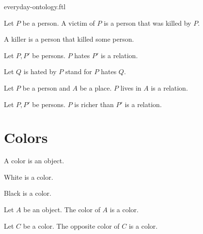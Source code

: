 \documentclass{stex}
\begin{document}
\begin{smodule}{everyday-ontology.ftl}
  \begin{fdefinition*}
    Let $P$ be a person.
    A victim of $P$ is a person that was killed by $P$.
  \end{fdefinition*}

  \begin{fdefinition*}
    A killer is a person that killed some person.
  \end{fdefinition*}

  \begin{fsignature*}
    Let $P, P'$ be persons.
    $P$ hates $P'$ is a relation.
  \end{fsignature*}

  \begin{fconvention*}
    Let $Q$ is hated by $P$ stand for $P$ hates $Q$.
  \end{fconvention*}

  \begin{fsignature*}
    Let $P$ be a person and $A$ be a place.
    $P$ lives in $A$ is a relation.
  \end{fsignature*}

  \begin{fsignature*}
    Let $P, P'$ be persons.
    $P$ is richer than $P'$ is a relation.
  \end{fsignature*}


  \section*{Colors}

  \begin{fsignature*}
    A color is an object.
  \end{fsignature*}

  \begin{fsignature*}
    White is a color.
  \end{fsignature*}

  \begin{fsignature*}
    Black is a color.
  \end{fsignature*}

  \begin{fsignature*}
    Let $A$ be an object.
    The color of $A$ is a color.
  \end{fsignature*}

  \begin{fsignature*}
    Let $C$ be a color.
    The opposite color of $C$ is a color.
  \end{fsignature*}



\end{smodule}
\end{document}
